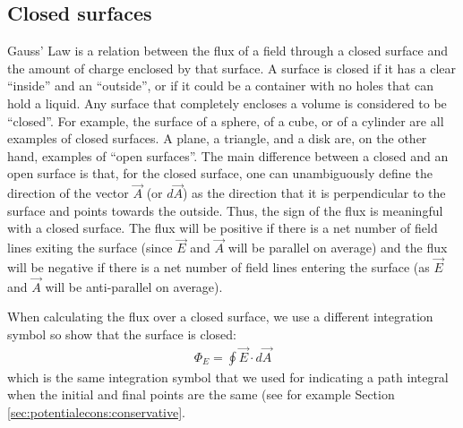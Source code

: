\subsection{Closed surfaces}
\label{sec:gauss:closedsurfaces}
Gauss' Law is a relation between the flux of a field through a closed surface and the amount of charge enclosed by that surface. A surface is closed if it has a clear ``inside'' and an ``outside'', or if it could be a container with no holes that can hold a liquid. Any surface that completely encloses a volume is considered to be ``closed''. For example, the surface of a sphere, of a cube, or of a cylinder are all examples of closed surfaces. A plane, a triangle, and a disk are, on the other hand, examples of ``open surfaces''. The main difference between a closed and an open surface is that, for the closed surface, one can unambiguously define the direction of the vector $\vec A$ (or $d\vec A$) as the direction that it is perpendicular to the surface and points towards the outside. Thus, the sign of the flux is meaningful with a closed surface. The flux will be positive if there is a net number of field lines exiting the surface (since $\vec E$ and $\vec A$ will be parallel on average) and the flux will be negative if there is a net number of field lines entering the surface (as $\vec E$ and $\vec A$ will be anti-parallel on average).

When calculating the flux over a closed surface, we use a different integration symbol so show that the surface is closed:
\begin{align*}
\Phi_E=\oint \vec E\cdot d\vec A
\end{align*}
which is the same integration symbol that we used for indicating a path integral when the initial and final points are the same (see for example Section \ref{sec:potentialecons:conservative}.


